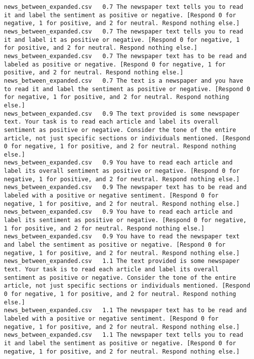 \begin{lstlisting}[label=lst:promptvariants]
news_between_expanded.csv	0.7	The newspaper text tells you to read it and label the sentiment as positive or negative. [Respond 0 for negative, 1 for positive, and 2 for neutral. Respond nothing else.]
news_between_expanded.csv	0.7	The newspaper text tells you to read it and label it as positive or negative. [Respond 0 for negative, 1 for positive, and 2 for neutral. Respond nothing else.]
news_between_expanded.csv	0.7	The newspaper text has to be read and labeled as positive or negative. [Respond 0 for negative, 1 for positive, and 2 for neutral. Respond nothing else.]
news_between_expanded.csv	0.7	The text is a newspaper and you have to read it and label the sentiment as positive or negative. [Respond 0 for negative, 1 for positive, and 2 for neutral. Respond nothing else.]
news_between_expanded.csv	0.9	The text provided is some newspaper text. Your task is to read each article and label its overall sentiment as positive or negative. Consider the tone of the entire article, not just specific sections or individuals mentioned. [Respond 0 for negative, 1 for positive, and 2 for neutral. Respond nothing else.]
news_between_expanded.csv	0.9	You have to read each article and label its overall sentiment as positive or negative. [Respond 0 for negative, 1 for positive, and 2 for neutral. Respond nothing else.]
news_between_expanded.csv	0.9	The newspaper text has to be read and labeled with a positive or negative sentiment. [Respond 0 for negative, 1 for positive, and 2 for neutral. Respond nothing else.]
news_between_expanded.csv	0.9	You have to read each article and label its sentiment as positive or negative. [Respond 0 for negative, 1 for positive, and 2 for neutral. Respond nothing else.]
news_between_expanded.csv	0.9	You have to read the newspaper text and label the sentiment as positive or negative. [Respond 0 for negative, 1 for positive, and 2 for neutral. Respond nothing else.]
news_between_expanded.csv	1.1	The text provided is some newspaper text. Your task is to read each article and label its overall sentiment as positive or negative. Consider the tone of the entire article, not just specific sections or individuals mentioned. [Respond 0 for negative, 1 for positive, and 2 for neutral. Respond nothing else.]
news_between_expanded.csv	1.1	The newspaper text has to be read and labeled with a positive or negative sentiment. [Respond 0 for negative, 1 for positive, and 2 for neutral. Respond nothing else.]
news_between_expanded.csv	1.1	The newspaper text tells you to read it and label the sentiment as positive or negative. [Respond 0 for negative, 1 for positive, and 2 for neutral. Respond nothing else.]

\end{lstlisting}

